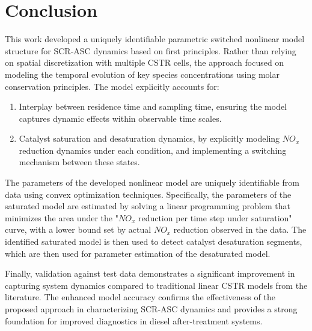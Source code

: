 \section{Conclusion}
This work developed a uniquely identifiable parametric switched nonlinear model structure for SCR-ASC dynamics based on
first principles. Rather than relying on spatial discretization with multiple CSTR cells, the approach focused on modeling the temporal evolution of key species concentrations using molar conservation principles. The model explicitly accounts for:

\begin{enumerate}
        \item Interplay between residence time and sampling time, ensuring the model captures dynamic effects within observable time scales.
        \item Catalyst saturation and desaturation dynamics, by explicitly modeling $NO_x$ reduction dynamics under each condition, and implementing a switching mechanism between these states.
\end{enumerate}

The parameters of the developed nonlinear model are uniquely identifiable from data using convex optimization
techniques. Specifically, the parameters of the saturated model are estimated by solving a linear programming problem
that minimizes the area under the "$NO_x$ reduction per time step under saturation" curve, with a lower bound set by
actual $NO_x$ reduction observed in the data. The identified saturated model is then used to detect catalyst
desaturation segments, which are then used for parameter estimation of the desaturated model.

Finally, validation against test data demonstrates a significant improvement in capturing system dynamics compared to
traditional linear CSTR models from the literature. The enhanced model accuracy confirms the effectiveness of the
proposed approach in characterizing SCR-ASC dynamics and provides a strong foundation for improved diagnostics in diesel
after-treatment systems.
